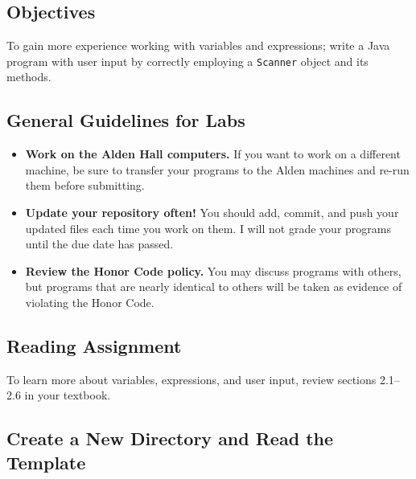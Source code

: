 



\vspace{-0.25in}
\subsection*{Objectives}

To gain more experience working with variables and expressions; write a Java program with user input by correctly
employing a {\tt Scanner} object and its methods.

\vspace{-0.15in}
\subsection*{General Guidelines for Labs}
\begin{itemize}
\item
{\bf Work on the Alden Hall computers.} If you want to work on a different
machine, be sure to transfer your programs to the Alden
machines and re-run them before submitting.
\item
{\bf Update your repository often!} You should add, commit, 
and push your updated files each time you work on them.  I will not grade 
your programs until the due date has passed.
\item
{\bf Review the Honor Code policy.} You
may discuss programs with others, but programs that are nearly identical
to others will be taken as evidence of violating the Honor Code.
\end{itemize}

\vspace{-0.25in}
\subsection*{Reading Assignment}

To learn more about variables, expressions, and user input, review sections 2.1--2.6 in your textbook. 

\vspace{-0.15in}
\subsection*{Create a New Directory and Read the Template}

